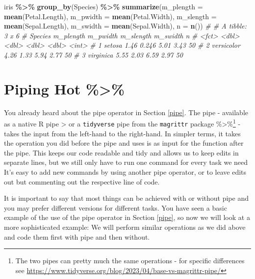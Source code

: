\documentclass[
]{book}
\newenvironment{Shaded}{\begin{snugshade}}{\end{snugshade}}
\newcommand{\AttributeTok}[1]{\textcolor[rgb]{0.13,0.29,0.53}{#1}}
\newcommand{\CommentTok}[1]{\textcolor[rgb]{0.56,0.35,0.01}{\textit{#1}}}
\newcommand{\FunctionTok}[1]{\textcolor[rgb]{0.13,0.29,0.53}{\textbf{#1}}}
\newcommand{\NormalTok}[1]{#1}
\newcommand{\SpecialCharTok}[1]{\textcolor[rgb]{0.81,0.36,0.00}{\textbf{#1}}}
\begin{document}
\begin{Shaded}
\begin{Highlighting}[]
\NormalTok{iris }\SpecialCharTok{\%\textgreater{}\%} 
  \FunctionTok{group\_by}\NormalTok{(Species) }\SpecialCharTok{\%\textgreater{}\%} 
  \FunctionTok{summarize}\NormalTok{(}\AttributeTok{m\_plength =} \FunctionTok{mean}\NormalTok{(Petal.Length),}
            \AttributeTok{m\_pwidth =} \FunctionTok{mean}\NormalTok{(Petal.Width),}
            \AttributeTok{m\_slength =} \FunctionTok{mean}\NormalTok{(Sepal.Length),}
            \AttributeTok{m\_swidth =} \FunctionTok{mean}\NormalTok{(Sepal.Width),}
            \AttributeTok{n =} \FunctionTok{n}\NormalTok{())}
\CommentTok{\# \# A tibble: 3 x 6}
\CommentTok{\#   Species    m\_plength m\_pwidth m\_slength m\_swidth     n}
\CommentTok{\#   \textless{}fct\textgreater{}          \textless{}dbl\textgreater{}    \textless{}dbl\textgreater{}     \textless{}dbl\textgreater{}    \textless{}dbl\textgreater{} \textless{}int\textgreater{}}
\CommentTok{\# 1 setosa          1.46    0.246      5.01     3.43    50}
\CommentTok{\# 2 versicolor      4.26    1.33       5.94     2.77    50}
\CommentTok{\# 3 virginica       5.55    2.03       6.59     2.97    50}
\end{Highlighting}
\end{Shaded}

\section*{Piping Hot \%\textgreater\%}\label{piping-hot}

You already heard about the pipe operator in Section \ref{pipe}.
The pipe - available as a native R pipe \textbar\textgreater{} or a \texttt{tidyverse} pipe from the \texttt{magrittr} package \%\textgreater\%\footnote{The two pipes can pretty much the same operations - for specific differences see \url{https://www.tidyverse.org/blog/2023/04/base-vs-magrittr-pipe/}} - takes the input from the left-hand to the right-hand.
In simpler terms, it takes the operation you did before the pipe and uses is as input for the function after the pipe.
This keeps our code readable and tidy and allows us to keep edits in separate lines, but we still only have to run one command for every task we need
It's easy to add new commands by using another pipe operator, or to leave edits out but commenting out the respective line of code.

It is important to say that most things can be achieved with or without pipe and you may prefer different versions for different tasks.
You have seen a basic example of the use of the pipe operator in Section \ref{pipe}, so now we will look at a more sophisticated example: We will perform similar operations as we did above and code them first with pipe and then without.
\end{document}
